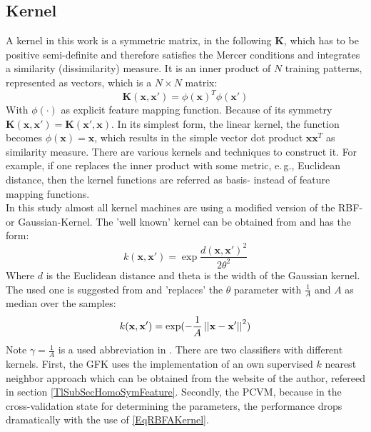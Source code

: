 \subsection{Kernel}\label{EmSubSecKernel}
A kernel in this work is a symmetric matrix, in the following $\mathbf{K}$, which has to be positive semi-definite and therefore satisfies the Mercer conditions and integrates a similarity (dissimilarity) measure.
It is an inner product of $N$ training patterns, represented as vectors, which is a $N \times N$ matrix:
\begin{equation}
\mathbf{K}(\mathbf{x},\mathbf{x'}) = \phi(\mathbf{x})^T\phi(\mathbf{x'})
\end{equation}
With $\phi(\cdot)$ as explicit feature mapping function.
Because of its symmetry $\mathbf{K}(\mathbf{x},\mathbf{x'})=\mathbf{K}(\mathbf{x'},\mathbf{x})$.
In its simplest form, the linear kernel, the function becomes $\phi(\mathbf{x}) = \mathbf{x}$, which results in the simple vector dot product $\mathbf{x}\mathbf{x}^T$ as similarity measure. There are various kernels and techniques to construct it. For example, if one replaces the inner product with some metric, e.\,g., Euclidean distance, then the kernel functions are referred as basis- instead of feature mapping functions.\cite[p. 291-296, 329]{Bishop.2009}\\
In this study almost all kernel machines are using a modified version of the \ac{RBF}- or Gaussian-Kernel.
The 'well known' kernel can be obtained from \cite[p. 17]{Vert.2004} and has the form:
\begin{equation}\label{EqRBFOriginalKernel}
k(\mathbf{x},\mathbf{x}') = \exp\frac{d(\mathbf{x},\mathbf{x}')^2}{2\theta^2}
\end{equation}
Where $d$ is the Euclidean distance and theta is the width of the Gaussian kernel.\\
The used one is suggested from \cite{Duan.2012} and 'replaces' the $\theta$ parameter with $\frac{1}{A}$ and $A$ as median over the samples: 
\begin{equation}\label{EqRBFAKernel}
k(\mathbf{x},\mathbf{x'}) = \exp(-\frac{1}{A}\left\vert\left\vert\mathbf{x}-\mathbf{x'}\right\vert\right\vert^2)
\end{equation} 
Note $\gamma = \frac{1}{A}$ is a used abbreviation in \cite{Long.2015}.
There are two classifiers with different kernels.
First, the \acs{GFK} uses the implementation of an own supervised $k$ nearest neighbor approach which can be obtained from the website of the author, refereed in section \ref{TlSubSecHomoSymFeature}.
Secondly, the \acs{PCVM}, because in the cross-validation state for determining the parameters, the performance drops dramatically with the use of \eqref{EqRBFAKernel}.
